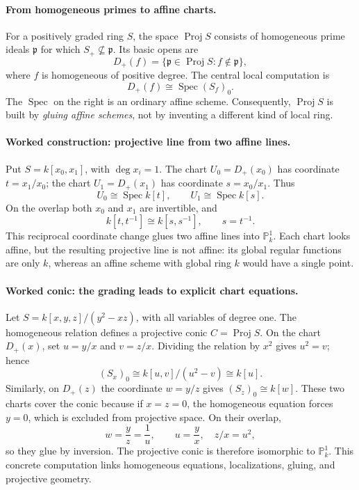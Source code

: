 \paragraph{From homogeneous primes to affine charts.}
For a positively graded ring \(S\), the space
\(\operatorname{Proj}S\) consists of homogeneous prime ideals
\(\mathfrak p\) for which \(S_+\not\subseteq\mathfrak p\).
Its basic opens are
\[
 D_+(f)=\{\mathfrak p\in\operatorname{Proj}S:f\notin\mathfrak p\},
\]
where \(f\) is homogeneous of positive degree. The central local
computation is
\[
 \boxed{D_+(f)\cong\operatorname{Spec}(S_f)_0.}
\]
The \(\operatorname{Spec}\) on the right is an ordinary affine
scheme. Consequently, \(\operatorname{Proj}S\) is built by
\emph{gluing affine schemes}, not by inventing a different kind
of local ring.

\paragraph{Worked construction: projective line from two affine lines.}
Put \(S=k[x_0,x_1]\), with \(\deg x_i=1\). The chart
\(U_0=D_+(x_0)\) has coordinate
\(t=x_1/x_0\); the chart \(U_1=D_+(x_1)\) has coordinate
\(s=x_0/x_1\). Thus
\[
 U_0\cong\operatorname{Spec}k[t],\qquad
 U_1\cong\operatorname{Spec}k[s].
\]
On the overlap both \(x_0\) and \(x_1\) are invertible, and
\[
 k[t,t^{-1}]\cong k[s,s^{-1}],\qquad s=t^{-1}.
\]
This reciprocal coordinate change glues two affine lines into
\(\mathbb P^1_k\). Each chart looks affine, but the resulting
projective line is not affine: its global regular functions are only
\(k\), whereas an affine scheme with global ring \(k\) would
have a single point.

\paragraph{Worked conic: the grading leads to explicit chart equations.}
Let \(S=k[x,y,z]/(y^2-xz)\), with all variables of degree one.
The homogeneous relation defines a projective conic
\(C=\operatorname{Proj}S\). On the chart \(D_+(x)\), set
\(u=y/x\) and \(v=z/x\). Dividing the relation by \(x^2\)
gives \(u^2=v\); hence
\[
 (S_x)_0\cong k[u,v]/(u^2-v)\cong k[u].
\]
Similarly, on \(D_+(z)\) the coordinate \(w=y/z\) gives
\((S_z)_0\cong k[w]\). These two charts cover the conic because
if \(x=z=0\), the homogeneous equation forces \(y=0\), which
is excluded from projective space. On their overlap,
\[
 w=\frac{y}{z}=\frac{1}{u},\qquad
 u=\frac{y}{x},\quad z/x=u^2,
\]
so they glue by inversion. The projective conic is therefore
isomorphic to \(\mathbb P^1_k\). This concrete computation links
homogeneous equations, localizations, gluing, and projective geometry.


